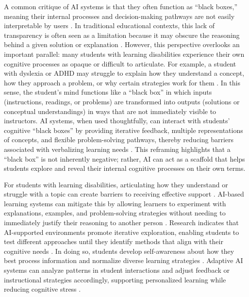 \documentclass[]{aastex701}
\begin{document}
A common critique of AI systems is that they often function as ``black boxes,'' meaning their internal processes and decision-making pathways are not easily interpretable by users \citep{Skogvoll2025, BenZion2025}. In traditional educational contexts, this lack of transparency is often seen as a limitation because it may obscure the reasoning behind a given solution or explanation \citep{Skogvoll2025}. However, this perspective overlooks an important parallel: many students with learning disabilities experience their own cognitive processes as opaque or difficult to articulate. For example, a student with dyslexia or ADHD may struggle to explain how they understand a concept, how they approach a problem, or why certain strategies work for them \citep{Almufareh2025, HarkinsBrown2025}. In this sense, the student's mind functions like a ``black box'' in which inputs (instructions, readings, or problems) are transformed into outputs (solutions or conceptual understandings) in ways that are not immediately visible to instructors. AI systems, when used thoughtfully, can interact with students' cognitive ``black boxes'' by providing iterative feedback, multiple representations of concepts, and flexible problem-solving pathways, thereby reducing barriers associated with verbalizing learning needs \citep{Voultsiou2025, Khowaja2025}. This reframing highlights that a ``black box'' is not inherently negative; rather, AI can act as a scaffold that helps students explore and reveal their internal cognitive processes on their own terms.

For students with learning disabilities, articulating how they understand or struggle with a topic can create barriers to receiving effective support \citep{Almufareh2025, HarkinsBrown2025}. AI-based learning systems can mitigate this by allowing learners to experiment with explanations, examples, and problem-solving strategies without needing to immediately justify their reasoning to another person \citep{Khowaja2025, Weijers2025}. Research indicates that AI-supported environments promote iterative exploration, enabling students to test different approaches until they identify methods that align with their cognitive needs \citep{Voultsiou2025, Khowaja2025}. In doing so, students develop self-awareness about how they best process information and normalize diverse learning strategies \citep{Voultsiou2025, Weijers2025}. Adaptive AI systems can analyze patterns in student interactions and adjust feedback or instructional strategies accordingly, supporting personalized learning while reducing cognitive stress \citep{Khowaja2025, Skogvoll2025}.
\end{document}
